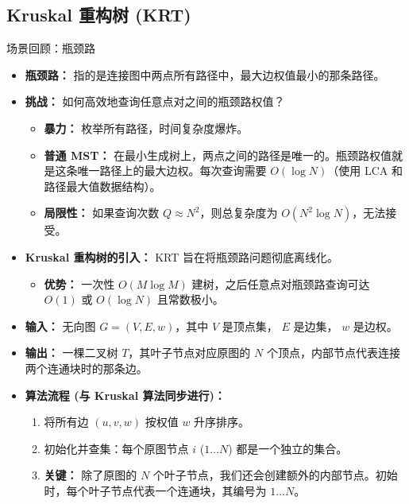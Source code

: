 \documentclass[11pt]{beamer}
\begin{document}
\subsection{Kruskal 重构树 (KRT)}
\begin{frame}{场景回顾：瓶颈路}
    \begin{itemize}
        \item \textbf{瓶颈路：} 指的是连接图中两点所有路径中，最大边权值最小的那条路径。
        \item \textbf{挑战：} 如何高效地查询任意点对之间的瓶颈路权值？
        \begin{itemize}
            \item \textbf{暴力：} 枚举所有路径，时间复杂度爆炸。
            \item \textbf{普通 MST：} 在最小生成树上，两点之间的路径是唯一的。瓶颈路权值就是这条唯一路径上的最大边权。每次查询需要 $O(\log N)$（使用 LCA 和路径最大值数据结构）。
            \item \textbf{局限性：} 如果查询次数 $Q \approx N^2$，则总复杂度为 $O(N^2 \log N)$，无法接受。
        \end{itemize}
        \item \textbf{Kruskal 重构树的引入：} KRT 旨在将瓶颈路问题彻底离线化。
        \begin{itemize}
            \item \textbf{优势：} 一次性 $O(M \log M)$ 建树，之后任意点对瓶颈路查询可达 $O(1)$ 或 $O(\log N)$ 且常数极小。
        \end{itemize}
    \end{itemize}
\end{frame}

\begin{frame}
    \begin{itemize}
        \item \textbf{输入：} 无向图 $G=(V, E, w)$，其中 $V$ 是顶点集， $E$ 是边集， $w$ 是边权。
        \item \textbf{输出：} 一棵二叉树 $T$，其叶子节点对应原图的 $N$ 个顶点，内部节点代表连接两个连通块时的那条边。
        \item \textbf{算法流程 (与 Kruskal 算法同步进行)：}
        \begin{enumerate}
            \item 将所有边 $(u, v, w)$ 按权值 $w$ 升序排序。
            \item 初始化并查集：每个原图节点 $i$ ($1 \dots N$) 都是一个独立的集合。
            \item \textbf{关键：} 除了原图的 $N$ 个叶子节点，我们还会创建额外的内部节点。初始时，每个叶子节点代表一个连通块，其编号为 $1 \dots N$。
        \end{enumerate}
    \end{itemize}
\end{frame}
\end{document}
